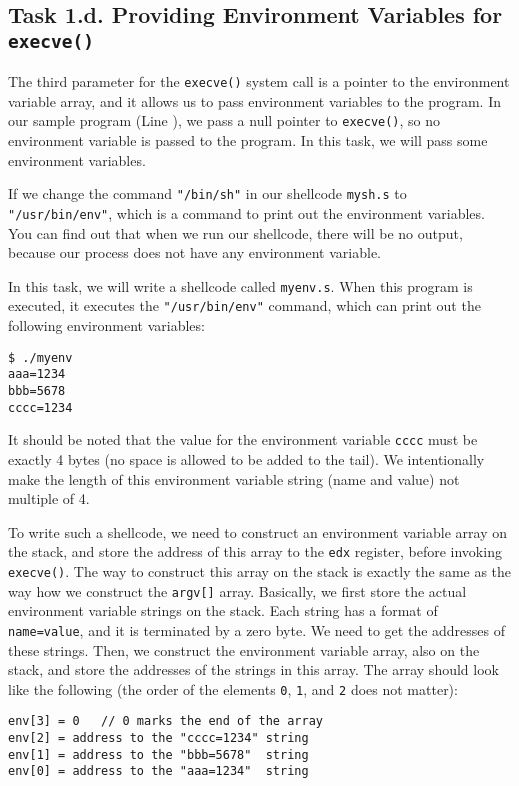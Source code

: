 \subsection{Task 1.d. Providing Environment Variables for \texttt{execve()}}

The third parameter for the \texttt{execve()} system call
is a pointer to the environment variable array, and it allows 
us to pass environment variables to the program. In our 
sample program (Line ), we
pass a null pointer to \texttt{execve()}, so
no environment variable is passed to the program. 
In this task, we will pass some environment variables. 

If we change the command \texttt{"/bin/sh"} in our shellcode
\texttt{mysh.s} to \texttt{"/usr/bin/env"}, which is a command to print out the 
environment variables. You can find out that when we run
our shellcode, there will be no output, because our 
process does not have any environment variable.


In this task, we will write a shellcode called \texttt{myenv.s}. When this 
program is executed, it executes the \texttt{"/usr/bin/env"} command, which
can print out the following environment variables: 

\begin{lstlisting}
$ ./myenv
aaa=1234
bbb=5678
cccc=1234
\end{lstlisting}

It should be noted that the value for the environment variable \texttt{cccc}
must be exactly 4 bytes (no space is allowed to be added to the tail).
We intentionally make the length of this environment variable string (name and value)
not multiple of 4.


To write such a shellcode, we need to construct an
environment variable array on the stack, 
and store the address of this array to the \texttt{edx} register,  
before invoking \texttt{execve()}.  
The way to construct this array on the stack is exactly the same
as the way how we construct the \texttt{argv[]} array. Basically,
we first store the actual environment variable strings on the stack.
Each string has a format of \texttt{name=value}, and it is terminated by
a zero byte. We need to get the addresses of these 
strings. Then, we construct the 
environment variable array, also on the stack, and store the 
addresses of the strings in this array.  
The array should look like the following (the order of 
the elements \texttt{0}, \texttt{1}, and \texttt{2} does not matter): 

\begin{lstlisting}
env[3] = 0   // 0 marks the end of the array
env[2] = address to the "cccc=1234" string
env[1] = address to the "bbb=5678"  string
env[0] = address to the "aaa=1234"  string
\end{lstlisting}









